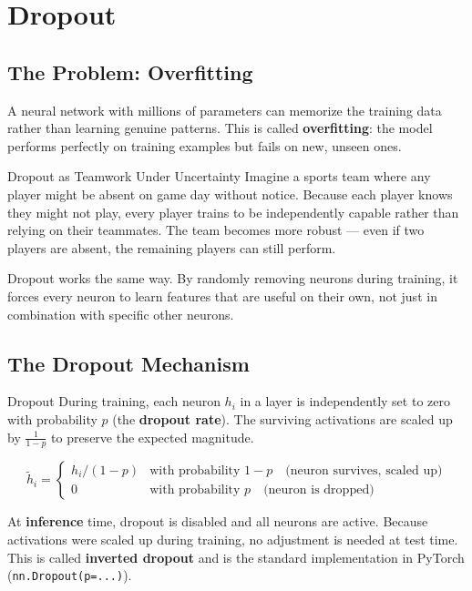 \section{Dropout}
\label{sec:dropout}

\subsection{The Problem: Overfitting}

A neural network with millions of parameters can memorize the training data rather than learning genuine patterns. This is called \textbf{overfitting}: the model performs perfectly on training examples but fails on new, unseen ones.

\begin{analogybox}{Dropout as Teamwork Under Uncertainty}
Imagine a sports team where any player might be absent on game day without notice. Because each player knows they might not play, every player trains to be independently capable rather than relying on their teammates. The team becomes more robust --- even if two players are absent, the remaining players can still perform.

Dropout works the same way. By randomly removing neurons during training, it forces every neuron to learn features that are useful on their own, not just in combination with specific other neurons.
\end{analogybox}

\subsection{The Dropout Mechanism}

\begin{mathbox}{Dropout}
During training, each neuron $h_i$ in a layer is independently set to zero with probability $p$ (the \textbf{dropout rate}). The surviving activations are scaled up by $\frac{1}{1-p}$ to preserve the expected magnitude.

\begin{equation}
    \tilde{h}_i = \begin{cases}
        h_i / (1-p) & \text{with probability } 1-p \quad \text{(neuron survives, scaled up)} \\
        0           & \text{with probability } p \quad \text{(neuron is dropped)}
    \end{cases}
\end{equation}

At \textbf{inference} time, dropout is disabled and all neurons are active. Because activations were scaled up during training, no adjustment is needed at test time. This is called \textbf{inverted dropout} and is the standard implementation in PyTorch (\texttt{nn.Dropout(p=...)}).
\end{mathbox}


